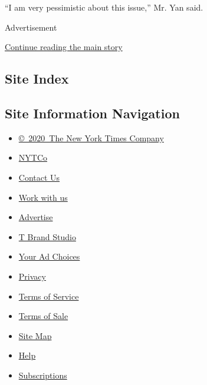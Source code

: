 ``I am very pessimistic about this issue,'' Mr. Yan said.

Advertisement

\protect\hyperlink{after-bottom}{Continue reading the main story}

\hypertarget{site-index}{%
\subsection{Site Index}\label{site-index}}

\hypertarget{site-information-navigation}{%
\subsection{Site Information
Navigation}\label{site-information-navigation}}

\begin{itemize}
\tightlist
\item
  \href{https://help.nytimes.com/hc/en-us/articles/115014792127-Copyright-notice}{©~2020~The
  New York Times Company}
\end{itemize}

\begin{itemize}
\tightlist
\item
  \href{https://www.nytco.com/}{NYTCo}
\item
  \href{https://help.nytimes.com/hc/en-us/articles/115015385887-Contact-Us}{Contact
  Us}
\item
  \href{https://www.nytco.com/careers/}{Work with us}
\item
  \href{https://nytmediakit.com/}{Advertise}
\item
  \href{http://www.tbrandstudio.com/}{T Brand Studio}
\item
  \href{https://www.nytimes.com/privacy/cookie-policy\#how-do-i-manage-trackers}{Your
  Ad Choices}
\item
  \href{https://www.nytimes.com/privacy}{Privacy}
\item
  \href{https://help.nytimes.com/hc/en-us/articles/115014893428-Terms-of-service}{Terms
  of Service}
\item
  \href{https://help.nytimes.com/hc/en-us/articles/115014893968-Terms-of-sale}{Terms
  of Sale}
\item
  \href{https://spiderbites.nytimes.com}{Site Map}
\item
  \href{https://help.nytimes.com/hc/en-us}{Help}
\item
  \href{https://www.nytimes.com/subscription?campaignId=37WXW}{Subscriptions}
\end{itemize}
